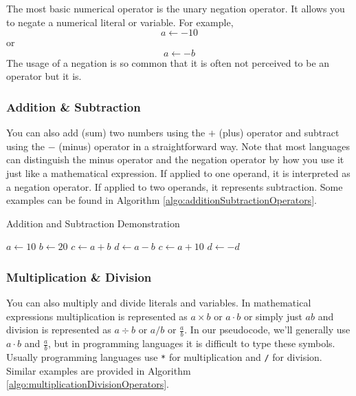 The most basic numerical operator is the  
unary negation operator.  It allows you to
negate a numerical literal or variable.  For example, 
  $$a \leftarrow -10$$
or
  $$a \leftarrow -b$$
The usage of a negation is so common that it is often not perceived to be an
operator but it is.

\subsubsection{Addition \& Subtraction}

You can also add (sum) two numbers using the $+$ (plus) operator and
subtract using the $-$ (minus) operator in a straightforward way.  Note that
most languages can distinguish the minus operator and the negation operator
by how you use it just like a mathematical expression.  If applied to one operand, it
is interpreted as a negation operator.  If applied to two operands, it represents
subtraction.  Some examples can be found in Algorithm \ref{algo:additionSubtractionOperators}.

\begin{algorithm}[H]
\caption{Addition and Subtraction Demonstration}
\label{algo:additionSubtractionOperators}
$a \leftarrow 10$ \;
$b \leftarrow 20$ \;
$c \leftarrow a + b$ \;
$d \leftarrow a - b$ \;
$c \leftarrow a + 10$ \;
$d \leftarrow -d$ \;
\end{algorithm}

\subsubsection{Multiplication \& Division}

You can also multiply and divide literals and variables.  In mathematical 
expressions multiplication is represented as $a \times b$ or $a \cdot b$ or 
simply just $ab$ and division is represented as $a \div b$ or $a / b$ or 
$\frac{a}{b}$.  In our pseudocode, we'll generally use $a\cdot b$ and 
$\frac{a}{b}$, but in programming languages it is difficult to type 
these symbols. Usually programming languages use \texttt{*}
for multiplication and \texttt{/} for division.  Similar examples are
provided in Algorithm \ref{algo:multiplicationDivisionOperators}.

